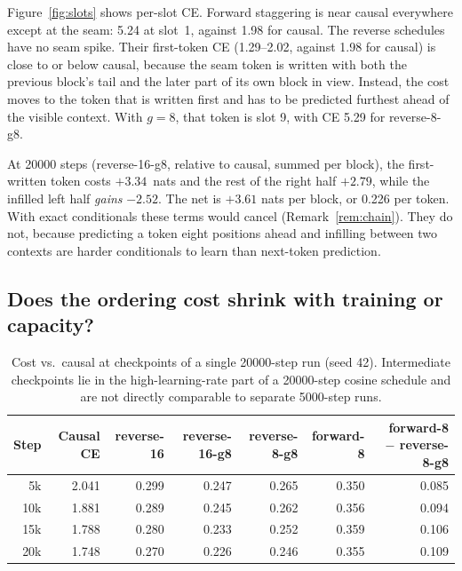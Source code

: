 \documentclass[11pt]{article}
\theoremstyle{definition}
\theoremstyle{remark}
\newcommand{\sch}[1]{\textsf{#1}}
\begin{document}
Figure~\ref{fig:slots} shows per-slot CE.
Forward staggering is near causal everywhere except at the seam: 5.24 at slot~1, against 1.98 for \sch{causal}.
The reverse schedules have no seam spike.
Their first-token CE (1.29--2.02, against 1.98 for causal) is close to or below causal, because the seam token is written with both the previous block's tail and the later part of its own block in view.
Instead, the cost moves to the token that is written first and has to be predicted furthest ahead of the visible context.
With $g=8$, that token is slot 9, with CE 5.29 for \sch{reverse-8-g8}.

At 20000 steps (\sch{reverse-16-g8}, relative to causal, summed per block), the first-written token costs $+3.34$~nats and the rest of the right half $+2.79$, while the infilled left half \emph{gains} $-2.52$.
The net is $+3.61$ nats per block, or 0.226 per token.
With exact conditionals these terms would cancel (Remark~\ref{rem:chain}).
They do not, because predicting a token eight positions ahead and infilling between two contexts are harder conditionals to learn than next-token prediction.

\subsection{Does the ordering cost shrink with training or capacity?}

\begin{table}[t]
  \centering
  \caption{Cost vs.\ causal at checkpoints of a single 20000-step run (seed 42). Intermediate checkpoints lie in the high-learning-rate part of a 20000-step cosine schedule and are not directly comparable to separate 5000-step runs.}
  \label{tab:long}
  \small
  \begin{tabular}{rrrrrrr}
    \toprule
    Step & Causal CE & \sch{reverse-16} & \sch{reverse-16-g8} & \sch{reverse-8-g8} & \sch{forward-8} & \sch{forward-8} $-$ \sch{reverse-8-g8} \\
    \midrule
    5k  & 2.041 & 0.299 & 0.247 & 0.265 & 0.350 & 0.085 \\
    10k & 1.881 & 0.289 & 0.245 & 0.262 & 0.356 & 0.094 \\
    15k & 1.788 & 0.280 & 0.233 & 0.252 & 0.359 & 0.106 \\
    20k & 1.748 & 0.270 & 0.226 & 0.246 & 0.355 & 0.109 \\
    \bottomrule
  \end{tabular}
\end{table}
\end{document}
